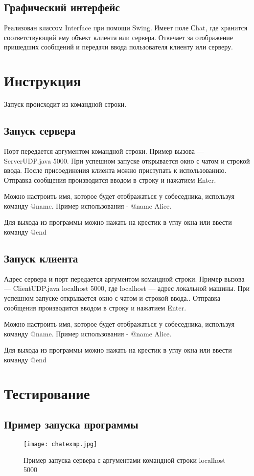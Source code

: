 \documentclass{article}
\begin{document}
\subsection{Графический интерфейс}
Реализован классом Interface при помощи Swing. Имеет поле Сhat, где хранится соответствующий ему объект клиента или сервера. Отвечает за отображение пришедших сообщений и передачи ввода пользователя клиенту или серверу.

\section{Инструкция}
Запуск происходит из командной строки.

\subsection{Запуск сервера}
Порт передается аргументом командной строки. Пример вызова --- ServerUDP.java 5000. При успешном запуске открывается окно с чатом и строкой ввода. После присоединения клиента можно приступать к использованию. Отправка сообщения производится вводом в строку и нажатием Enter.

Можно настроить имя, которое будет отображаться у собеседника, используя команду @name. Пример использования - @name Alice.

Для выхода из программы можно нажать на крестик в углу окна или ввести команду @end

\subsection{Запуск клиента}
Адрес сервера и порт передается аргументом командной строки. Пример вызова --- ClientUDP.java localhost 5000, где localhost --- адрес локальной машины. При успешном запуске открывается окно с чатом и строкой ввода.. Отправка сообщения производится вводом в строку и нажатием Enter.

Можно настроить имя, которое будет отображаться у собеседника, используя команду @name. Пример использования - @name Alice.

Для выхода из программы можно нажать на крестик в углу окна или ввести команду @end

\section{Тестирование}

\subsection{Пример запуска программы}
\begin{figure}[H]
	\begin{flushleft}
		\centerline{\texttt{[image: chatexmp.jpg]}}
		\caption{Пример запуска сервера с аргументами командной строки localhost 5000}
	\end{flushleft}
\end{figure}
\vspace{3cm}
\end{document}
